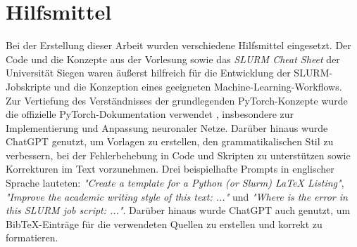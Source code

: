 \documentclass{article}
\begin{document}
\section{Hilfsmittel}
Bei der Erstellung dieser Arbeit wurden verschiedene Hilfsmittel 
eingesetzt. Der Code und die Konzepte aus der Vorlesung sowie das 
\textit{SLURM Cheat Sheet} 
der Universität Siegen \parencite{slurm_cheatsheet} waren
äußerst hilfreich für die Entwicklung der SLURM-Jobskripte und die 
Konzeption eines geeigneten Machine-Learning-Workflows.
Zur Vertiefung des Verständnisses der grundlegenden PyTorch-Konzepte 
wurde die offizielle PyTorch-Dokumentation verwendet 
\parencite{pytorch_docs},
insbesondere zur Implementierung und Anpassung neuronaler Netze.
Darüber hinaus wurde ChatGPT genutzt, um Vorlagen zu erstellen, den 
grammatikalischen Stil zu verbessern, bei der Fehlerbehebung in Code
und Skripten zu unterstützen
sowie Korrekturen im Text vorzunehmen.
Drei beispielhafte Prompts in englischer Sprache lauteten:
\textit{"Create a template for a Python (or Slurm) LaTeX Listing"},
\textit{"Improve the academic writing style of this text: ..."}
und
\textit{"Where is the error in this SLURM job script: ..."}. Darüber 
hinaus wurde ChatGPT auch genutzt, um BibTeX-Einträge für die 
verwendeten Quellen zu erstellen und korrekt zu formatieren.

\newpage
\printbibliography[title={Literaturverzeichnis}]
\end{document}
